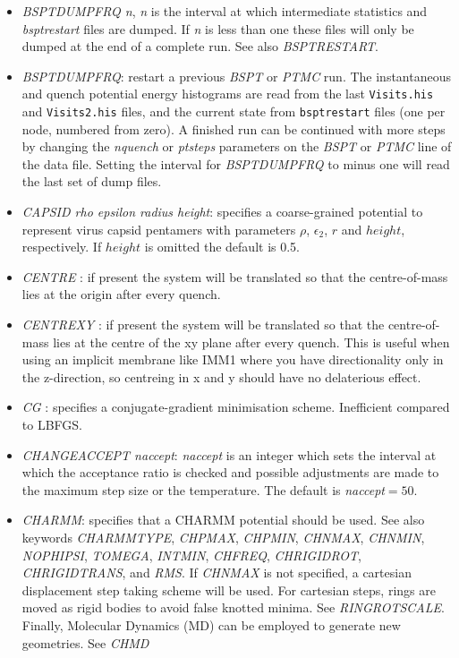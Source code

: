 \documentclass[12pt,a4paper,dvips]{article}
\begin{document}
\begin{itemize}
\item {\it BSPTDUMPFRQ n\/}, {\it n\/} is the interval at which intermediate statistics
and {\it bsptrestart\/} files are dumped. If {\it n\/} is less than one these files
will only be dumped at the end of a complete run. 
See also {\it BSPTRESTART\/}.

\item {\it BSPTDUMPFRQ\/}: restart a previous {\it BSPT\/} or {\it PTMC\/} run.
The instantaneous and quench potential energy histograms are read from the last
{\tt Visits.his} and {\tt Visits2.his} files, and the current state from 
{\tt bsptrestart} files (one per node, numbered from zero).
A finished run can be continued with more steps by changing the {\it nquench} 
or {\it ptsteps} parameters on the {\it BSPT\/} or {\it PTMC\/} line of
the data file. Setting the interval for {\it BSPTDUMPFRQ} to
minus one will read the last set of dump files.


\item {\it CAPSID rho epsilon radius height\/}: specifies a coarse-grained potential to represent virus capsid pentamers
with parameters $\rho$, $\epsilon_2$, $r$ and $height$, respectively.
If $height$ is omitted the default is 0.5.

\item {\it CENTRE \/}: if present the system will be translated so that the centre-of-mass 
lies at the origin after every quench.

\item {\it CENTREXY \/}: if present the system will be translated so that the centre-of-mass 
lies at the centre of the xy plane after every quench. This is useful when using an implicit membrane like IMM1 where you have directionality only in the
z-direction, so centreing in x and y should have no delaterious effect.

\item {\it CG \/}: specifies a conjugate-gradient minimisation scheme. Inefficient compared to LBFGS.

\item {\it CHANGEACCEPT naccept\/}: {\it naccept\/} is an integer which sets the interval
at which the acceptance ratio is checked and possible adjustments are made to the maximum
step size or the temperature. The default is {\it naccept\/}$=50$.
  
\item {\it CHARMM}: specifies that a CHARMM potential should be used.
See also keywords {\it CHARMMTYPE}, {\it CHPMAX}, {\it CHPMIN}, {\it CHNMAX}, {\it CHNMIN},
{\it NOPHIPSI}, {\it TOMEGA}, {\it INTMIN}, {\it CHFREQ}, {\it CHRIGIDROT}, 
{\it CHRIGIDTRANS}, and {\it RMS}. If {\it CHNMAX} is not specified, a cartesian 
displacement step taking scheme will be used. For cartesian steps, rings are moved as rigid bodies to avoid false knotted minima. See {\it RINGROTSCALE}. Finally, Molecular Dynamics (MD) can be employed to generate new geometries. See {\it CHMD} 


\end{itemize}
\end{document}
